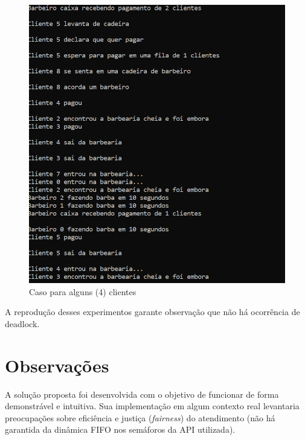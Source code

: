 \documentclass{article}
\begin{document}
\begin{figure}[H]
    \centering
    \includegraphics[scale=0.7]{10_clients.png}
    \caption{Caso para alguns (4) clientes}
 
\end{figure}

A reprodução desses experimentos garante observação que não há ocorrência de deadlock.

\section{Observações}

A solução proposta foi desenvolvida com o objetivo de funcionar de forma demonstrável e intuitiva. Sua implementação em algum contexto real levantaria preocupações sobre eficiência e justiça (\textit{fairness}) do atendimento (não há garantida da dinâmica FIFO nos semáforos da API utilizada).
\end{document}
